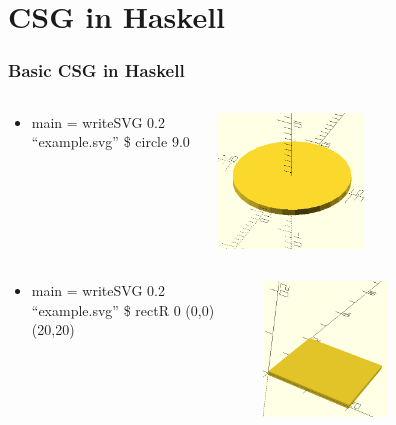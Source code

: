 \documentclass{beamer}
\begin{document}
\section{CSG in Haskell}

\begin{frame}
\frametitle{Basic CSG in Haskell}
\begin{columns}
  \begin{column}{0.5\textwidth}
    \begin{itemize}
    \item main = writeSVG 0.2 ``example.svg'' \$ circle 9.0
    \end{itemize}
  \end{column}
  \begin{column}{0.5\textwidth}
    \includegraphics[width=0.5\textwidth, right]{openscad-circle_9.png}
  \end{column}
\end{columns}
\begin{columns}
  \begin{column}{0.5\textwidth}
    \begin{itemize}
    \item main = writeSVG 0.2 ``example.svg'' \$ rectR 0 (0,0) (20,20)
    \end{itemize}
  \end{column}
  \begin{column}{0.5\textwidth}
    \includegraphics[width=0.5\textwidth, right]{openscad-square_20.png}
  \end{column}
\end{columns}
\end{frame}
\end{document}
